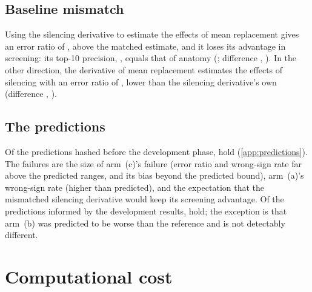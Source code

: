 \subsection{Baseline mismatch}
\label{sec:mismatch}

Using the silencing derivative to estimate the effects of mean replacement gives an error ratio of \RatioMisMeanFull{} \RatioCIMisMeanFull{}, \MisMeanMinusMatchedFull{} \MisMeanMinusMatchedCIFull{} above the matched estimate, and it loses its advantage in screening: its top-10 precision, \TopTenMisMeanFull{}, equals that of anatomy (\AnatMisMeanFull{}; difference \MisMeanTopAnatFull{}, \MisMeanTopAnatCIFull{}). In the other direction, the derivative of mean replacement estimates the effects of silencing with an error ratio of \RatioMisZeroFull{} \RatioCIMisZeroFull{}, lower than the silencing derivative's own (difference \MisZeroMinusRefFull{}, \MisZeroMinusRefCIFull{}).

\subsection{The predictions}
\label{sec:predictions}

Of the \PredPrimaryTotal{} predictions hashed before the development phase, \PredPrimaryHeld{} hold (\cref{app:predictions}). The failures are the size of arm~(c)'s failure (error ratio and wrong-sign rate far above the predicted ranges, and its bias beyond the predicted bound), arm~(a)'s wrong-sign rate (higher than predicted), and the expectation that the mismatched silencing derivative would keep its screening advantage. Of the \PredAddendumTotal{} predictions informed by the development results, \PredAddendumHeld{} hold; the exception is that arm~(b) was predicted to be worse than the reference and is not detectably different.

\section{Computational cost}
\label{sec:cost}

